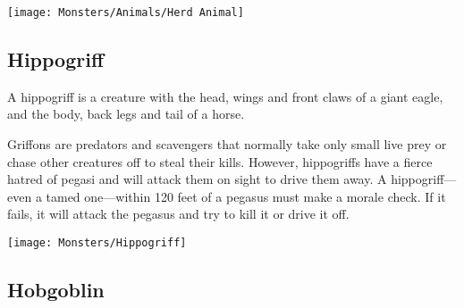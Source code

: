 \begin{multicols*}{2}
\texttt{[image: Monsters/Animals/Herd Animal]}

\subsection{Hippogriff}\label{monster:Hippogriff}

A hippogriff is a creature with the head, wings and front claws of a giant eagle, and the body, back legs and tail of a horse.

Griffons are predators and scavengers that normally take only small live prey or chase other creatures off to steal their kills. However, hippogriffs have a fierce hatred of pegasi and will attack them on sight to drive them away. A hippogriff—even a tamed one—within 120 feet of a pegasus must make a morale check. If it fails, it will attack the pegasus and try to kill it or drive it off.

\texttt{[image: Monsters/Hippogriff]}

\subsection{Hobgoblin}
\end{multicols*}
